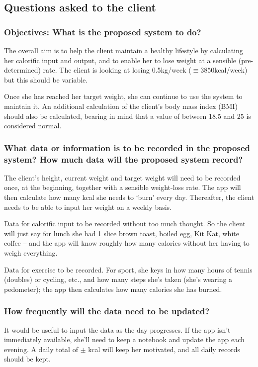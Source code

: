 \subsection{Questions asked to the client}

\subsubsection{Objectives: What is the proposed system to do?}
The overall aim is to help the client maintain a healthy lifestyle by calculating her calorific input and output, and to enable her to lose weight at a sensible (pre-determined) rate. The client is looking at losing 0.5kg/week ($\equiv 3850$kcal/week) but this should be variable.

Once she has reached her target weight, she can continue to use the system to maintain it. An additional calculation of the client's body mass index (BMI) should also be calculated, bearing in mind that a value of between 18.5 and 25 is considered normal.

\subsubsection{What data or information is to be recorded in the proposed system? How much data will the proposed system record?}
The client's height, current weight and target weight will need to be recorded once, at the beginning, together with a sensible weight-loss rate. The app will then calculate how many kcal she needs to `burn' every day. Thereafter, the client needs to be able to input her weight on a weekly basis.

Data for calorific input to be recorded without too much thought. So the client will just say for lunch she had 1 slice brown toast, boiled egg, Kit Kat, white coffee – and the app will know roughly how many calories without her having to weigh everything. 

Data for exercise to be recorded. For sport, she keys in how many hours of tennis (doubles) or cycling, etc., and how many steps she's taken (she's wearing a pedometer); the app then calculates how many calories she has burned.

\subsubsection{How frequently will the data need to be updated?}
It would be useful to input the data as the day progresses. If the app isn't immediately available, she'll need to keep a notebook and update the app each evening. A daily total of $\pm$ kcal will keep her motivated, and all daily records should be kept.

